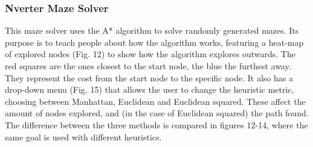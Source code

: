 \documentclass[titlepage]{article}
\begin{document}
\subsubsection{Nverter Maze Solver}
This maze solver uses the A* algorithm to solve randomly generated mazes. Its purpose is to teach people about how the algorithm works, featuring a heat-map of explored nodes (Fig. 12) to show how the algorithm explores outwards. The red squares are the ones closest to the start node, the blue the furthest away. They represent the cost from the start node to the specific node. It also has a drop-down menu (Fig. 15) that allows the user to change the heuristic metric, choosing between Manhattan, Euclidean and Euclidean squared. These affect the amount of nodes explored, and (in the case of Euclidean squared) the path found. The difference between the three methods is compared in figures 12-14, where the same goal is used with different heuristics. \cite{nverter}
\end{document}
